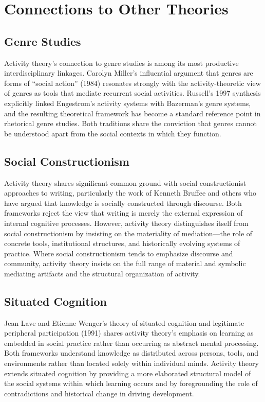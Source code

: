 \documentclass[12pt]{article}
\begin{document}
\section{Connections to Other Theories}

\subsection{Genre Studies}

Activity theory's connection to genre studies is among its most productive interdisciplinary linkages. Carolyn Miller's influential argument that genres are forms of ``social action'' (1984) resonates strongly with the activity-theoretic view of genres as tools that mediate recurrent social activities. Russell's 1997 synthesis explicitly linked Engestrom's activity systems with Bazerman's genre systems, and the resulting theoretical framework has become a standard reference point in rhetorical genre studies. Both traditions share the conviction that genres cannot be understood apart from the social contexts in which they function.

\subsection{Social Constructionism}

Activity theory shares significant common ground with social constructionist approaches to writing, particularly the work of Kenneth Bruffee and others who have argued that knowledge is socially constructed through discourse. Both frameworks reject the view that writing is merely the external expression of internal cognitive processes. However, activity theory distinguishes itself from social constructionism by insisting on the materiality of mediation---the role of concrete tools, institutional structures, and historically evolving systems of practice. Where social constructionism tends to emphasize discourse and community, activity theory insists on the full range of material and symbolic mediating artifacts and the structural organization of activity.

\subsection{Situated Cognition}

Jean Lave and Etienne Wenger's theory of situated cognition and legitimate peripheral participation (1991) shares activity theory's emphasis on learning as embedded in social practice rather than occurring as abstract mental processing. Both frameworks understand knowledge as distributed across persons, tools, and environments rather than located solely within individual minds. Activity theory extends situated cognition by providing a more elaborated structural model of the social systems within which learning occurs and by foregrounding the role of contradictions and historical change in driving development.
\end{document}
